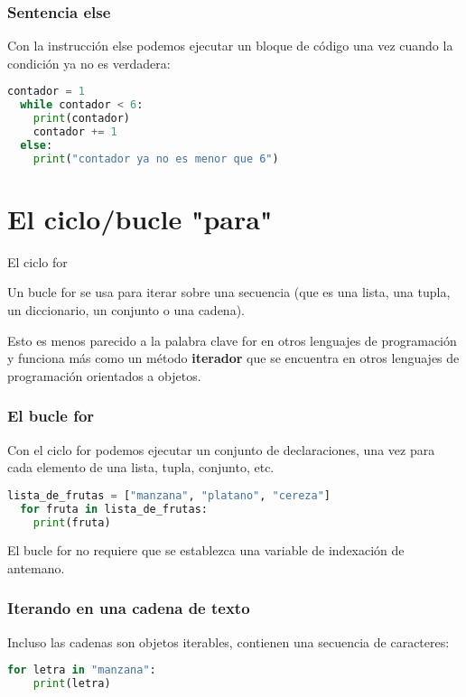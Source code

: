 \begin{frame}[fragile]
  \frametitle{Sentencia \textbf{else}}

  Con la instrucción \textcolor{codeKeyword}{else} podemos ejecutar un bloque de código
  una vez cuando la condición ya no es verdadera:

  \vspace{\baselineskip}
  \begin{lstlisting}[language=Python]
  contador = 1
  while contador < 6:
    print(contador)
    contador += 1
  else:
    print("contador ya no es menor que 6")
  \end{lstlisting}
\end{frame}

\section{El ciclo/bucle "para"}

\begin{frame}[c]{El ciclo for}

  Un bucle \textcolor{codeKeyword}{for} se usa para iterar sobre una secuencia
  (que es una lista, una tupla, un diccionario, un conjunto o una cadena).

  \vspace{\baselineskip}
  Esto es menos parecido a la palabra clave \textcolor{codeKeyword}{for} en
  otros lenguajes de programación y funciona más como un método
  \textbf{iterador} que se encuentra en otros lenguajes de programación
  orientados a objetos.
\end{frame}

\begin{frame}[fragile]
  \frametitle{El bucle for}

  Con el ciclo for podemos ejecutar un conjunto de declaraciones,
  una vez para cada elemento de una lista, tupla, conjunto, etc.

  \vspace{\baselineskip}
  \begin{lstlisting}[language=Python]
  lista_de_frutas = ["manzana", "platano", "cereza"]
  for fruta in lista_de_frutas:
    print(fruta)
  \end{lstlisting}

  \vspace{\baselineskip}
  El bucle for no requiere que se establezca una variable de
  indexación de antemano.
\end{frame}

\begin{frame}[fragile]
  \frametitle{Iterando en una cadena de texto}

  Incluso las cadenas son objetos iterables, contienen una
  secuencia de caracteres:

  \vspace{\baselineskip}
  \begin{lstlisting}[language=Python]
  for letra in "manzana":
    print(letra)
  \end{lstlisting}
\end{frame}

